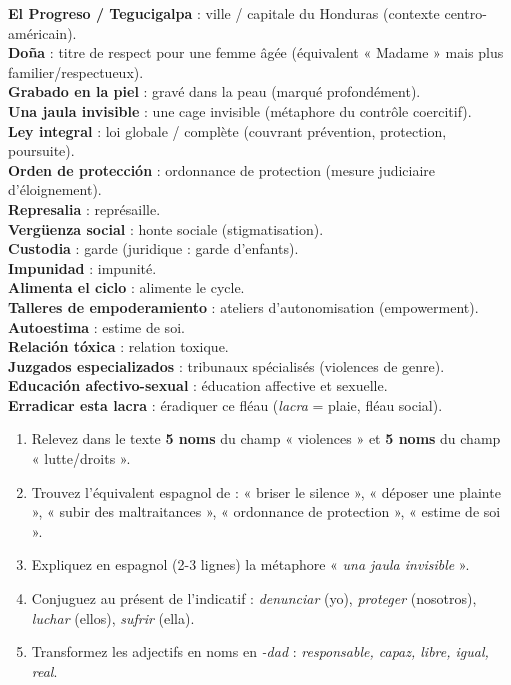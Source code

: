 \documentclass[11pt]{article}
\begin{document}
\begin{definition}
\textbf{El Progreso / Tegucigalpa} : ville / capitale du Honduras (contexte centro-américain). \\
\textbf{Doña} : titre de respect pour une femme âgée (équivalent « Madame » mais plus familier/respectueux). \\
\textbf{Grabado en la piel} : gravé dans la peau (marqué profondément). \\
\textbf{Una jaula invisible} : une cage invisible (métaphore du contrôle coercitif). \\
\textbf{Ley integral} : loi globale / complète (couvrant prévention, protection, poursuite). \\
\textbf{Orden de protección} : ordonnance de protection (mesure judiciaire d'éloignement). \\
\textbf{Represalia} : représaille. \\
\textbf{Vergüenza social} : honte sociale (stigmatisation). \\
\textbf{Custodia} : garde (juridique : garde d'enfants). \\
\textbf{Impunidad} : impunité. \\
\textbf{Alimenta el ciclo} : alimente le cycle. \\
\textbf{Talleres de empoderamiento} : ateliers d'autonomisation (empowerment). \\
\textbf{Autoestima} : estime de soi. \\
\textbf{Relación tóxica} : relation toxique. \\
\textbf{Juzgados especializados} : tribunaux spécialisés (violences de genre). \\
\textbf{Educación afectivo-sexual} : éducation affective et sexuelle. \\
\textbf{Erradicar esta lacra} : éradiquer ce fléau (\emph{lacra} = plaie, fléau social).
\end{definition}

\begin{exercice}
\begin{enumerate}
\item Relevez dans le texte \textbf{5 noms} du champ « violences » et \textbf{5 noms} du champ « lutte/droits ».
\item Trouvez l'équivalent espagnol de : « briser le silence », « déposer une plainte », « subir des maltraitances », « ordonnance de protection », « estime de soi ».
\item Expliquez en espagnol (2-3 lignes) la métaphore « \emph{una jaula invisible} ».
\item Conjuguez au présent de l'indicatif : \emph{denunciar} (yo), \emph{proteger} (nosotros), \emph{luchar} (ellos), \emph{sufrir} (ella).
\item Transformez les adjectifs en noms en \emph{-dad} : \emph{responsable, capaz, libre, igual, real}.
\end{enumerate}
\end{exercice}
\end{document}
